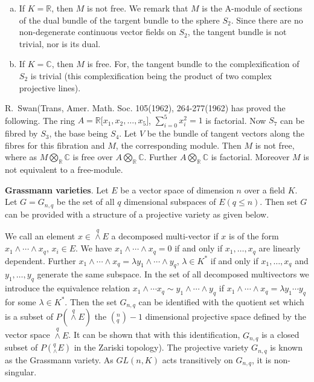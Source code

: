 \begin{enumerate}[(a)]
\item If $K = \mathbb{R}$, then $M$ is not free. We remark that $M$ is
  the A-module of sections of the dual bundle of the targent bundle to
  the sphere $S_2$. Since there are no non-degenerate continuous
  vector fields on $S_2$, the tangent bundle is not trivial, nor is
  its dual. 

\item If $K = \mathbb{C}$, then $M$ is free. For, the tangent bundle
  to the complexification   of $S_2$ is trivial (this complexification
  being the product of two complex projective lines). 
\end{enumerate}  
  
\begin{remark*} %
R.~Swan\pageoriginale (Trans, Amer. Math. Soc. 105(1962), 264-277(1962) has
proved the following. The ring $A = \mathbb{R} \big[x_1, x_2, \ldots
  , x_5 \big]$, $\sum\limits_{i = 0}^5 x^2_i = 1$ is factorial. Now
$S_7$ can be fibred by $S_3$, the base being $S_4$. Let $V$ be the
bundle of tangent vectors along the fibres for this fibration and $M$,
the corresponding module. Then $M$ is not free, where as $M
\bigotimes\limits_{\mathbb{R}} \mathbb{C}$ is free over $A
\bigotimes\limits_{\mathbb{R}} \mathbb{C}$. Further $A
\bigotimes\limits_{\mathbb{R}} \mathbb{C}$ is factorial. Moreover $M$
is not equivalent to a free-module. 
\end{remark*}  
  
\medskip
  \noindent
  \textbf{Grassmann varieties}. Let $E$ be a vector space of dimension
  $n$ over a field $K$. Let $G = G_{n, q}$ be the set of all $q$
  dimensional subspaces of $E (q \le n)$. Then set $G$ can be provided
  with a structure of a projective variety as given below. 
  
  We call an element $x \in \overset{q}{\wedge} E$ a decomposed
  multi-vector if $x$ is of the form $x_1 \wedge \cdots \wedge x_q$,
  $x_i \in E$. We have $x_1 \wedge \cdots  \wedge x_q = 0$ if and only
  if $x_1, \ldots , x_q$ are linearly dependent. Further $x_1 \wedge
  \cdots \wedge x_q = \lambda y_1 \wedge \cdots \wedge y_q$, $\lambda
  \in K^*$ if and only if $x_1 , \ldots , x_q$ and $y_1 , \ldots ,
  y_q$ generate the same subspace. In the set of all decomposed
  multivectors we introduce the equivalence relation $x_1 \wedge
  \cdots x_q \sim y_1 \wedge \cdots \wedge y_q $ if $x_1 \wedge \cdots
  \wedge x_q = \lambda y_1 \cdots y_q$ for some $\lambda \in K^*$. Then
  the set $G_{n, q} $ can be identified with the quotient set which is
  a subset of $P (\overset{q}{\wedge} E)$ the $(^n_q) - 1$ dimensional
  projective space defined by the vector space  $\overset{q}{\wedge}
  E$. It can be shown that with this identification,  $G_{n, q}$ is a
  closed subset of $P (^q_{\wedge} E)$ in the Zariski topology). The
  projective variety $G_{n, q}$ is known as the Grassmann variety. As
  $GL(n, K)$ acts transitively on $G_{n, q}$, it is non-singular. 
  
